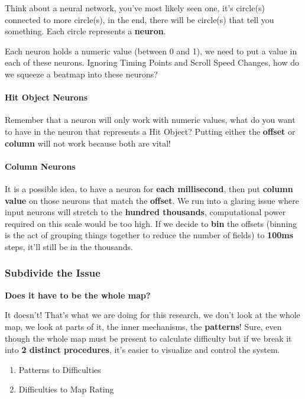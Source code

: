 \documentclass{article}
\begin{document}
Think about a neural network, you've most likely seen one, it's circle(s) connected to more circle(s), in the end, there will be circle(s) that tell you something. Each circle represents a \textbf{neuron}.

Each neuron holds a numeric value (between 0 and 1), we need to put a value in each of these neurons. Ignoring Timing Points and Scroll Speed Changes, how do we squeeze a beatmap into these neurons?

\paragraph{Hit Object Neurons} Remember that a neuron will only work with numeric values, what do you want to have in the neuron that represents a Hit Object? Putting either the \textbf{offset} or \textbf{column} will not work because both are vital!

\paragraph{Column Neurons} It is a possible idea, to have a neuron for \textbf{each millisecond}, then put \textbf{column value} on those neurons that match the \textbf{offset}. We run into a glaring issue where input neurons will stretch to the \textbf{hundred thousands}, computational power required on this scale would be too high. If we decide to \textbf{bin} the offsets (binning is the act of grouping things together to reduce the number of fields) to \textbf{100ms} steps, it'll still be in the thousands.

\subsubsection{Subdivide the Issue}

\textbf{Does it have to be the whole map?}

It doesn't! That's what we are doing for this research, we don't look at the whole map, we look at parts of it, the inner mechanisms, the \textbf{patterns}! Sure, even though the whole map must be present to calculate difficulty but if we break it into \textbf{2 distinct procedures}, it's easier to visualize and control the system.

\begin{enumerate}
	\item Patterns to Difficulties
	\item Difficulties to Map Rating
\end{enumerate}
\end{document}
